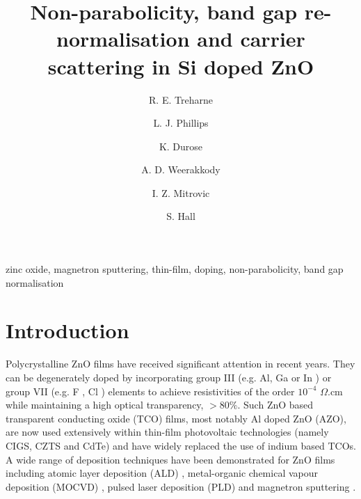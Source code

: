 \documentclass[final,5p,times]{elsarticle}
\begin{document}
\begin{frontmatter}


\title{Non-parabolicity, band gap re-normalisation and carrier scattering in Si doped ZnO}
\author[label1]{R. E. Treharne}
\author[label1]{L. J. Phillips}
\author[label1]{K. Durose}
\address[label1]{Stephenson Institute for Renewable Energy, University of Liverpool, UK}
\author[label2]{A. D. Weerakkody}
\author[label2]{I. Z. Mitrovic}
\author[label2]{S. Hall}
\address[label2]{Department of Electrical Eng. and Electronics, University of Liverpool, UK}

\begin{abstract}

\end{abstract}


\begin{keyword}
zinc oxide, magnetron sputtering, thin-film, doping, non-parabolicity, band gap normalisation
\end{keyword}

\end{frontmatter}


\section{Introduction}

Polycrystalline ZnO films have received significant attention in recent years. They can be degenerately doped by incorporating group III (e.g. Al, Ga or In \cite{Minami2005}) or group VII (e.g. F \cite{Gordon1991, Treharne2010}, Cl \cite{Lincot2009}) elements to achieve resistivities of the order $10^{-4}$ $\Omega$.cm while maintaining a high optical transparency, $>80\%$. Such ZnO based transparent conducting oxide (TCO) films, most notably Al doped ZnO (AZO), are now used extensively within thin-film photovoltaic technologies (namely CIGS, CZTS and CdTe) and have widely replaced the use of indium based TCOs. A wide range of deposition techniques have been demonstrated for ZnO films including atomic layer deposition (ALD) \cite{Chalker2013}, metal-organic chemical vapour deposition (MOCVD) \cite{Myong1997}, pulsed laser deposition (PLD) \cite{Shin2006} and magnetron sputtering \cite{Minami2005, Minami2006, Ellmer2001}. 
\end{document}
